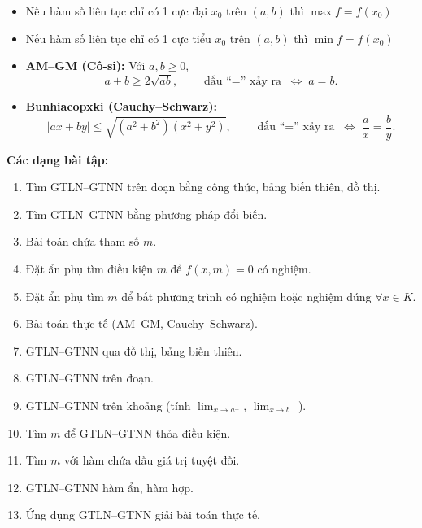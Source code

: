 \documentclass[12pt,a4paper]{article}
\begin{document}
\begin{luuy}
  \begin{itemize}
    \item Nếu hàm số liên tục chỉ có 1 cực đại $x_0$ trên $(a, b)$ thì $\max f = f(x_0)$
    \item Nếu hàm số liên tục chỉ có 1 cực tiểu $x_0$ trên $(a, b)$ thì $\min f = f(x_0)$
  \end{itemize}
\end{luuy}

\begin{congthuc}[title={Bất đẳng thức thường dùng}]
  \begin{itemize}
    \item \textbf{AM--GM (Cô-si):} Với $a, b \ge 0$,
      \[
        a + b \ge 2\sqrt{ab}, \qquad \text{dấu ``$=$'' xảy ra} \;\Leftrightarrow\; a = b.
      \]
    \item \textbf{Bunhiacopxki (Cauchy--Schwarz):}
      \[
        |ax + by| \le \sqrt{(a^2 + b^2)(x^2 + y^2)}, \qquad \text{dấu ``$=$'' xảy ra} \;\Leftrightarrow\; \dfrac{a}{x} = \dfrac{b}{y}.
      \]
  \end{itemize}
\end{congthuc}

\medskip\noindent\textbf{Các dạng bài tập:}
\begin{enumerate}[label=\textbf{Dạng \arabic*:}, leftmargin=*, align=left]
  \item Tìm GTLN--GTNN trên đoạn bằng công thức, bảng biến thiên, đồ thị.
  \item Tìm GTLN--GTNN bằng phương pháp đổi biến.
  \item Bài toán chứa tham số $m$.
  \item Đặt ẩn phụ tìm điều kiện $m$ để $f(x,m) = 0$ có nghiệm.
  \item Đặt ẩn phụ tìm $m$ để bất phương trình có nghiệm hoặc nghiệm đúng $\forall x \in K$.
  \item Bài toán thực tế (AM--GM, Cauchy--Schwarz).
  \item GTLN--GTNN qua đồ thị, bảng biến thiên.
  \item GTLN--GTNN trên đoạn.
  \item GTLN--GTNN trên khoảng (tính $\lim_{x \to a^+}$, $\lim_{x \to b^-}$).
  \item Tìm $m$ để GTLN--GTNN thỏa điều kiện.
  \item Tìm $m$ với hàm chứa dấu giá trị tuyệt đối.
  \item GTLN--GTNN hàm ẩn, hàm hợp.
  \item Ứng dụng GTLN--GTNN giải bài toán thực tế.
\end{enumerate}
\end{document}
